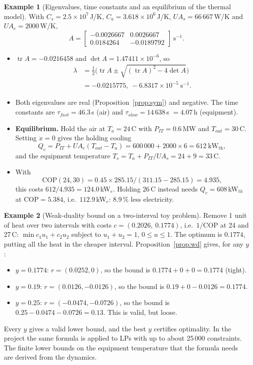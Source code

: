 \documentclass[12pt,a4paper]{report}
\theoremstyle{definition}
\newtheorem{example}{Example}[chapter]
\newcommand{\COP}{\mathrm{COP}}
\begin{document}
\begin{example}[Eigenvalues, time constants and an equilibrium of the thermal model]\label{ex:eig}
With $C_s=2.5\times10^7$\,J/K, $C_a=3.618\times10^6$\,J/K, $UA_s=66\,667$\,W/K and $UA_e=2000$\,W/K,
\[
A=\begin{bmatrix}-0.0026667&0.0026667\\0.0184264&-0.0189792\end{bmatrix}\ \mathrm{s^{-1}}.
\]
\begin{itemize}
\item $\operatorname{tr}A=-0.0216458$ and $\det A=1.47411\times10^{-6}$, so
\[
\begin{aligned}
\lambda&=\tfrac12\big(\operatorname{tr}A\pm\sqrt{(\operatorname{tr}A)^2-4\det A}\big)\\
&=-0.0215775,\ -6.8317\times10^{-5}\ \mathrm{s^{-1}}.
\end{aligned}
\]
\item Both eigenvalues are real (Proposition~\ref{prop:sym}) and negative. The time constants are $\tau_{fast}=46.3$\,s (air) and $\tau_{slow}=14\,638$\,s $=4.07$\,h (equipment).
\item \textbf{Equilibrium.} Hold the air at $T_a=24$\,\textdegree C with $P_{IT}=0.6$\,MW and $T_{out}=30$\,\textdegree C. Setting $\dot x=0$ gives the holding cooling
\[
Q_c=P_{IT}+UA_e(T_{out}-T_a)=600\,000+2000\times 6=612\ \mathrm{kW_{th}},
\]
and the equipment temperature $T_s=T_a+P_{IT}/UA_s=24+9=33$\,\textdegree C.
\item With
\[
\COP(24,30)=0.45\times285.15/(311.15-285.15)=4.935,
\]
this costs $612/4.935=124.0$\,kW$_e$. Holding 26\,\textdegree C instead needs $Q_c=608$\,kW$_{th}$ at $\COP=5.384$, i.e.\ $112.9$\,kW$_e$: 8.9\,\% less electricity.
\end{itemize}
\end{example}

\begin{example}[Weak-duality bound on a two-interval toy problem]\label{ex:wd}
Remove 1 unit of heat over two intervals with costs $c=(0.2026,\ 0.1774)$, i.e.\ $1/\COP$ at 24 and 27\,\textdegree C: $\min c_1u_1+c_2u_2$ subject to $u_1+u_2=1$, $0\le u\le1$. The optimum is $0.1774$, putting all the heat in the cheaper interval. Proposition~\ref{prop:wd} gives, for any $y$:
\begin{itemize}
\item $y=0.1774$: $r=(0.0252,0)$, so the bound is $0.1774+0+0=0.1774$ (tight).
\item $y=0.19$: $r=(0.0126,-0.0126)$, so the bound is $0.19+0-0.0126=0.1774$.
\item $y=0.25$: $r=(-0.0474,-0.0726)$, so the bound is $0.25-0.0474-0.0726=0.13$. This is valid, but loose.
\end{itemize}
Every $y$ gives a valid lower bound, and the best $y$ certifies optimality. In the project the same formula is applied to LPs with up to about 25\,000 constraints. The finite lower bounds on the equipment temperature that the formula needs are derived from the dynamics.
\end{example}
\end{document}

